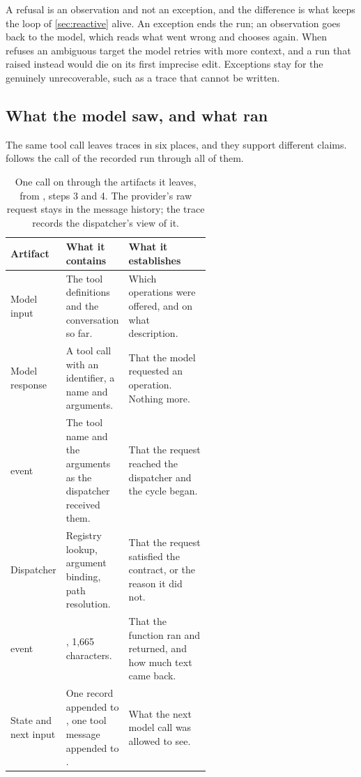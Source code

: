 \ei

A refusal is an observation and not an exception, and the difference is what keeps the loop of
\cref{sec:reactive} alive. An exception ends the run; an observation goes back to the model, which
reads what went wrong and chooses again. When  refuses an ambiguous target the model
retries with more context, and a run that raised instead would die on its first imprecise edit.
Exceptions stay for the genuinely unrecoverable, such as a trace that cannot be written.

\subsection{What the model saw, and what ran}
\label{sec:boundary-artifacts}

The same tool call leaves traces in six places, and they support different claims.
 follows the  call of the recorded run through all
of them.

\begin{table}[htbp]
  \centering
  \begin{adjustbox}{width=\linewidth}\begin{tabularx}{\linewidth}{@{}L{0.27\linewidth}L{0.30\linewidth}X@{}}
    \toprule
    \textbf{Artifact} & \textbf{What it contains} & \textbf{What it establishes} \\
    \midrule
    Model input & The tool definitions and the conversation so far. & Which operations were
      offered, and on what description. \\
    Model response & A tool call with an identifier, a name and arguments. & That the model
      requested an operation. Nothing more. \\
     event & The tool name and the arguments as the dispatcher received
      them. & That the request reached the dispatcher and the cycle began. \\
    Dispatcher & Registry lookup, argument binding, path resolution. & That the request satisfied
      the contract, or the reason it did not. \\
     event & , 1,665 characters. & That the function ran and
      returned, and how much text came back. \\
    State and next input & One record appended to , one tool message appended
      to . & What the next model call was allowed to see. \\
    \bottomrule
  \end{tabularx}\end{adjustbox}
  \caption{One  call on  through the
  artifacts it leaves, from , steps 3 and 4. The provider's raw
  request stays in the message history; the trace records the dispatcher's view of it.}
  \label{tab:boundary-artifacts}
\end{table}

